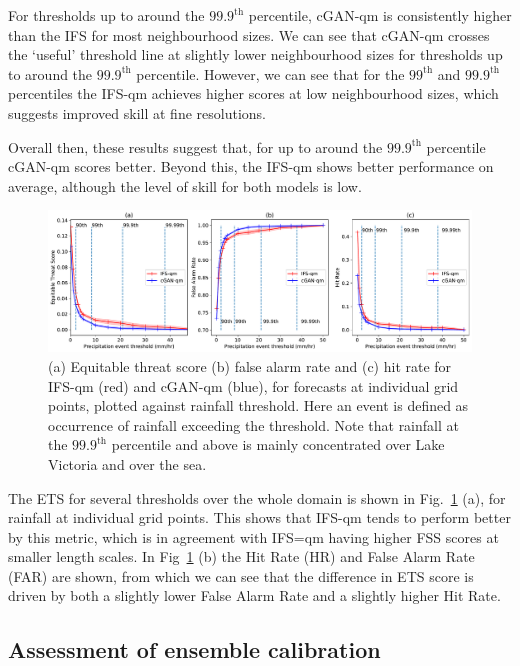 \documentclass{article}
\begin{document}
For thresholds up to around the $99.9^{\text{th}}$ percentile, cGAN-qm is consistently higher than the IFS for most neighbourhood sizes. We can see that cGAN-qm crosses the `useful' threshold line at slightly lower neighbourhood sizes for thresholds up to around the $99.9^{\text{th}}$ percentile. However, we can see that for the $99^{\text{th}}$ and $99.9^{\text{th}}$ percentiles the IFS-qm achieves higher scores at low neighbourhood sizes, which suggests improved skill at fine resolutions. 

Overall then, these results suggest that, for up to around the $99.9^{\text{th}}$ percentile cGAN-qm scores better. Beyond this, the IFS-qm shows better performance on average, although the level of skill for both models is low.



\begin{figure}[ht!]
    \centering
     \includegraphics[width=\textwidth]{images/ets_final-nologs_217600.pdf}
    
     \caption{ (a) Equitable threat score (b) false alarm rate and (c) hit rate for IFS-qm (red) and cGAN-qm (blue), for forecasts at individual grid points, plotted against rainfall threshold. Here an event is defined as occurrence of rainfall exceeding the threshold. Note that rainfall at the $99.9^{\text{th}}$ percentile and above is mainly concentrated over Lake Victoria and over the sea.}
     \label{fig:ets}
\end{figure}


The ETS for several thresholds over the whole domain is shown in Fig.~\ref{fig:ets} (a), for rainfall at individual grid points. This shows that IFS-qm tends to perform better by this metric, which is in agreement with IFS=qm having higher FSS scores at smaller length scales. In Fig~\ref{fig:ets} (b) the Hit Rate (HR) and False Alarm Rate (FAR) are shown, from which we can see that the difference in ETS score is driven by both a slightly lower False Alarm Rate and a slightly higher Hit Rate.

        
\subsection{Assessment of ensemble calibration}
\label{sec:ens_calib}
\end{document}
